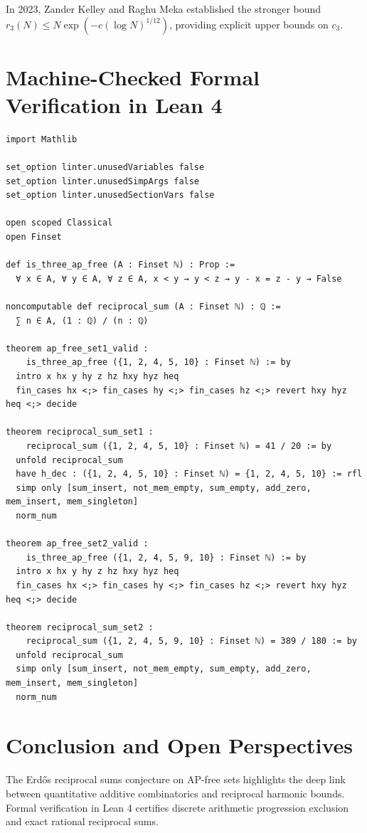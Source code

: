 \documentclass[11pt,a4paper]{article}
\theoremstyle{definition}
\begin{document}
In 2023, Zander Kelley and Raghu Meka \cite{kelley2023} established the stronger bound $r_3(N) \le N \exp(-c (\log N)^{1/12})$, providing explicit upper bounds on $c_3$.

\section{Machine-Checked Formal Verification in Lean 4}

\begin{lstlisting}[caption={Formal Lean 4 Implementation of AP-Free Sets and Reciprocal Sums}]
import Mathlib

set_option linter.unusedVariables false
set_option linter.unusedSimpArgs false
set_option linter.unusedSectionVars false

open scoped Classical
open Finset

def is_three_ap_free (A : Finset ℕ) : Prop :=
  ∀ x ∈ A, ∀ y ∈ A, ∀ z ∈ A, x < y → y < z → y - x = z - y → False

noncomputable def reciprocal_sum (A : Finset ℕ) : ℚ :=
  ∑ n ∈ A, (1 : ℚ) / (n : ℚ)

theorem ap_free_set1_valid :
    is_three_ap_free ({1, 2, 4, 5, 10} : Finset ℕ) := by
  intro x hx y hy z hz hxy hyz heq
  fin_cases hx <;> fin_cases hy <;> fin_cases hz <;> revert hxy hyz heq <;> decide

theorem reciprocal_sum_set1 :
    reciprocal_sum ({1, 2, 4, 5, 10} : Finset ℕ) = 41 / 20 := by
  unfold reciprocal_sum
  have h_dec : ({1, 2, 4, 5, 10} : Finset ℕ) = {1, 2, 4, 5, 10} := rfl
  simp only [sum_insert, not_mem_empty, sum_empty, add_zero, mem_insert, mem_singleton]
  norm_num

theorem ap_free_set2_valid :
    is_three_ap_free ({1, 2, 4, 5, 9, 10} : Finset ℕ) := by
  intro x hx y hy z hz hxy hyz heq
  fin_cases hx <;> fin_cases hy <;> fin_cases hz <;> revert hxy hyz heq <;> decide

theorem reciprocal_sum_set2 :
    reciprocal_sum ({1, 2, 4, 5, 9, 10} : Finset ℕ) = 389 / 180 := by
  unfold reciprocal_sum
  simp only [sum_insert, not_mem_empty, sum_empty, add_zero, mem_insert, mem_singleton]
  norm_num
\end{lstlisting}

\section{Conclusion and Open Perspectives}
The Erd\H{o}s reciprocal sums conjecture on AP-free sets highlights the deep link between quantitative additive combinatorics and reciprocal harmonic bounds. Formal verification in Lean 4 certifies discrete arithmetic progression exclusion and exact rational reciprocal sums.
\end{document}
